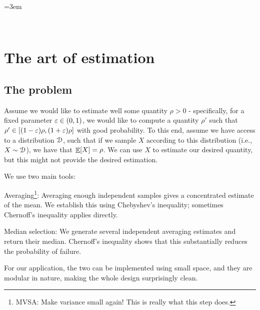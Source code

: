 %
\emergencystretch=3em






\noindent%
\ChapterPrefix{}%
\ChapterGen{}

~


\bigskip%



\section{The art of estimation}

\subsection{The problem}
Assume we would like to estimate well some quantity $\rho > 0$ -
specifically, for a fixed parameter ${\varepsilon} \in (0,1)$, we would like to
compute a quantity $\rho'$ such that
$\rho' \in [(1-{\varepsilon})\rho, (1+{\varepsilon})\rho]$ with good probability.  To
this end, assume we have access to a distribution $\EuScript{D}$,
such that if we sample $X$ according to this distribution (i.e.,
$X \sim \EuScript{D}$), we have that $\mathop{\mathbb{E}}\!\left[ {X} \right] = \rho$. We can use $X$
to estimate our desired quantity, but this might not provide the
desired estimation.

We use two main tools:
\begin{compactenumI}
    \smallskip%
    \item \textsf{Averaging}\footnote{MVSA: Make variance small again!
       This is really what this step does.}: Averaging enough independent
    samples gives a concentrated estimate of the mean. We establish this
    using Chebyshev's inequality; sometimes Chernoff's inequality applies
    directly.

    \smallskip
    \item \textsf{Median selection}: We generate several independent
    averaging estimates and return their median. Chernoff's inequality
    shows that this substantially reduces the probability of failure.
    
\end{compactenumI}
\smallskip%
For our application, the two can be implemented using small space, and
they are modular in nature, making the whole design surprisingly clean.

